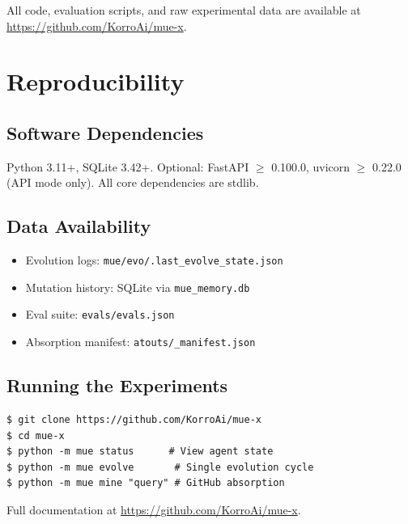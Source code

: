 \documentclass[11pt,a4paper]{article}
\begin{document}
All code, evaluation scripts, and raw experimental data are available at \url{https://github.com/KorroAi/mue-x}.

\section*{Reproducibility}

\subsection*{Software Dependencies}
Python 3.11+, SQLite 3.42+. Optional: FastAPI $\geq$ 0.100.0, uvicorn $\geq$ 0.22.0 (API mode only). All core dependencies are stdlib.

\subsection*{Data Availability}
\begin{itemize}
    \item Evolution logs: \texttt{mue/evo/.last\_evolve\_state.json}
    \item Mutation history: SQLite via \texttt{mue\_memory.db}
    \item Eval suite: \texttt{evals/evals.json}
    \item Absorption manifest: \texttt{atouts/\_manifest.json}
\end{itemize}

\subsection*{Running the Experiments}
\begin{verbatim}
$ git clone https://github.com/KorroAi/mue-x
$ cd mue-x
$ python -m mue status      # View agent state
$ python -m mue evolve       # Single evolution cycle
$ python -m mue mine "query" # GitHub absorption
\end{verbatim}

Full documentation at \url{https://github.com/KorroAi/mue-x}.
\end{document}
